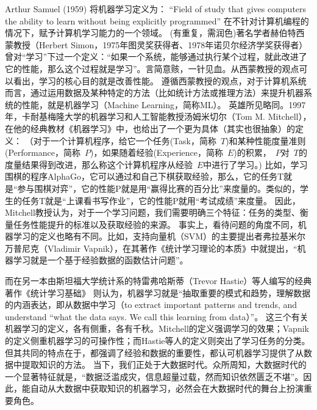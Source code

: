 
Arthur Samuel (1959) 将机器学习定义为：
“Field of study that gives computers the ability to learn without being explicitly programmed”
在不针对计算机编程的情况下，赋予计算机学习能力的一个领域。
 (有重复，需润色)著名学者赫伯特\textperiodcentered 西蒙教授（Herbert Simon，1975年图灵奖获得者、1978年诺贝尔经济学奖获得者）曾对“学习”下过一个定义：“如果一个系统，能够通过执行某个过程，就此改进了它的性能，那么这个过程就是学习”。言简意赅，一针见血。从西蒙教授的观点可以看出，学习的核心目的就是改善性能。
遵循西蒙教授的观点，对于计算机系统而言，通过运用数据及某种特定的方法（比如统计方法或推理方法）来提升机器系统的性能，就是机器学习（Machine Learning，简称ML）。
英雄所见略同。1997年，卡耐基梅隆大学的机器学习和人工智能教授汤姆\textperiodcentered 米切尔（Tom M. Mitchell），在他的经典教材《机器学习》\cite{mitchell1997}中，也给出了一个更为具体（其实也很抽象）的定义：
（对于一个计算机程序，给它一个任务(Task，简称~$T$)和某种性能度量准则(Performance，简称~$P$)，如果随着经验(Experience，简称~$E$)的积累，~$P$对~$T$的度量结果得到改进，那么称这个计算机程序从经验~$E$中进行了学习。)
比如，学习围棋的程序AlphaGo，它可以通过和自己下棋获取经验，那么，它的任务T就是“参与围棋对弈”，它的性能P就是用“赢得比赛的百分比”来度量的。类似的，学生的任务T就是“上课看书写作业”，它的性能P就用“考试成绩”来度量。
因此，Mitchell教授认为，对于一个学习问题，我们需要明确三个特征：任务的类型、衡量任务性能提升的标准以及获取经验的来源。
事实上，看待问题的角度不同，机器学习的定义也略有不同。比如，支持向量机（SVM）的主要提出者弗拉基米尔\textperiodcentered 万普尼克（Vladimir Vapnik），在其著作《统计学习理论的本质》\cite{vapnik2000中文}中就提出，“机器学习就是一个基于经验数据的函数估计问题”。

而在另一本由斯坦福大学统计系的特雷弗\textperiodcentered 哈斯蒂（Trevor Hastie）等人编写的经典著作《统计学习基础》\cite{hastie2015} 则认为，机器学习就是“抽取重要的模式和趋势，理解数据的内涵表达，即从数据中学习（to extract important patterns and trends, and understand “what the data says. We call this learning from data）”。
这三个有关机器学习的定义，各有侧重，各有千秋。Mitchell的定义强调学习的效果；Vapnik的定义侧重机器学习的可操作性；而Hastie等人的定义则突出了学习任务的分类。但其共同的特点在于，都强调了经验和数据的重要性，都认可机器学习提供了从数据中提取知识的方法。
当下，我们正处于大数据时代。众所周知，大数据时代的一个显著特征就是，“数据泛滥成灾，信息超量过载，然而知识依然匮乏不堪”。因此，能自动从大数据中获取知识的机器学习，必然会在大数据时代的舞台上扮演重要角色。

